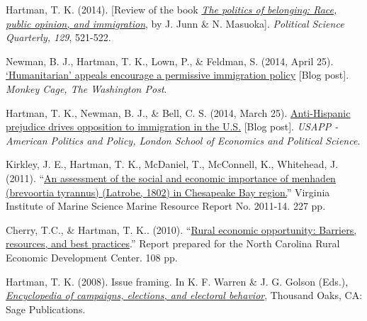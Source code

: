 \documentclass[12pt]{article}
\renewcommand{\section}[1]{\pagebreak[3]%
    \vspace{1.3\baselineskip}%
    \phantomsection\addcontentsline{toc}{section}{#1}%
    \noindent\llap{\scshape\smash{\parbox[t]{\marginparwidth}{\hyphenpenalty=10000\raggedright #1}}}%
    \vspace{-\baselineskip}\par}
\newcommand{\halfblankline}{\quad\vspace{-0.5\baselineskip}\pagebreak[3]}
\begin{document}
\begin{bibenum}
	\item Hartman, T. K. (2014). [Review of the book 
    \href{http://onlinelibrary.wiley.com/doi/10.1002/polq.12227/abstract}	
	{\emph{The politics of belonging: Race, public opinion, and immigration}}, 
		by J. Junn \& N. Masuoka]. \emph{Political 
		Science Quarterly, 129}, 521-522.
		
	\item Newman, B. J., {Hartman, T. K.}, Lown, P., \& Feldman, S. (2014, April 25). 
	\href{http://www.washingtonpost.com/blogs/monkey-cage/wp/2014/04/25/humanitarian-appeals-encourage-a-permissive-immigration-policy/}
		{`Humanitarian' appeals encourage a permissive immigration policy} [Blog post]. 
		\textit{Monkey Cage, The Washington Post}.
		
	\item {Hartman, T. K.}, Newman, B. J., \& Bell, C. S. (2014, March 25). 
	\href{http://eprints.lse.ac.uk/58765/}
	{Anti-Hispanic prejudice drives opposition to immigration in the U.S.} [Blog post]. 
	\textit{USAPP - American Politics and Policy, London School of Economics and Political Science}.

	\item Kirkley, J. E., {Hartman, T. K.}, McDaniel, T., McConnell, K., Whitehead, J. (2011).
	``\href{http://web.vims.edu/GreyLit/VIMS/mrr11-14.pdf}
	{An assessment of the social and economic importance 
   of menhaden (brevoortia tyrannus) (Latrobe, 1802) in Chesapeake Bay region.}''    
    Virginia Institute of Marine Science Marine Resource Report No. 2011-14. 227 pp.
    
    \item Cherry, T.C., \& {Hartman, T. K.}. (2010).
    ``\href{http://tkhartman.staff.shef.ac.uk/_content/documents/Cherry.Hartman.2010.pdf}
    {Rural economic opportunity: Barriers, resources, and best practices}.'' 
    Report prepared for the North Carolina Rural Economic Development Center.  108 pp.
	
    \item Hartman, T. K. (2008). Issue framing. 
          In K. F. Warren \& J. G. Golson (Eds.),
          \href{http://www.sagepub.com/books/Book231694}
          {\emph{Encyclopedia of campaigns, elections, and electoral behavior}}, 
          Thousand Oaks, CA: Sage Publications.
\end{bibenum}

\halfblankline

\section{Funding}
\end{document}
